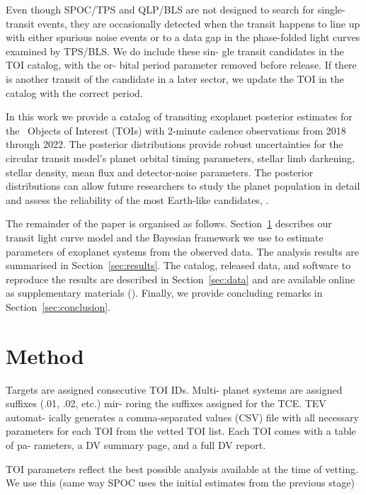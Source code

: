 \documentclass[linenumbers,floatfix,ApJL,twocolumn]{aastex631}
\begin{document}
Even though SPOC/TPS and QLP/BLS are not designed to search for single-transit events, they are occasionally detected when the transit happens to line up with either spurious noise events or to a data gap in the phase-folded light curves examined by TPS/BLS. We do include these sin- gle transit candidates in the TOI catalog, with the or- bital period parameter removed before release. If there is another transit of the candidate in a later sector, we update the TOI in the catalog with the correct period.

In this work we provide a catalog of transiting exoplanet posterior estimates for the \red{\numAnalysed} \tess\ Objects of Interest (TOIs) with 2-minute cadence observations from 2018 through 2022.
The posterior distributions provide robust uncertainties for the circular transit model's planet orbital timing parameters, stellar limb darkening, stellar density, mean flux and detector-noise parameters.
The posterior distributions can allow future researchers to study the planet population in detail and assess the reliability of the most Earth-like candidates, .

The remainder of the paper is organised as follows. Section~\ref{sec:method} describes our transit light curve model and the Bayesian framework we use to estimate parameters of exoplanet systems from the observed data.
The analysis results are summarised in Section~\ref{sec:results}.
The catalog, released data, and software to reproduce the results are described in Section~\ref{sec:data} and are available online as supplementary materials (\atlasUrl).
Finally, we provide concluding remarks in Section~\ref{sec:conclusion}.


\section{Method} \label{sec:method}


Targets are assigned consecutive TOI IDs. Multi- planet systems are assigned suffixes (.01, .02, etc.) mir- roring the suffixes assigned for the TCE. TEV automat- ically generates a comma-separated values (CSV) file with all necessary parameters for each TOI from the vetted TOI list. Each TOI comes with a table of pa- rameters, a DV summary page, and a full DV report.

TOI parameters reflect the best possible analysis available at the time of vetting.
We use this (same way SPOC uses the initial estimates from the previous stage)
\end{document}
